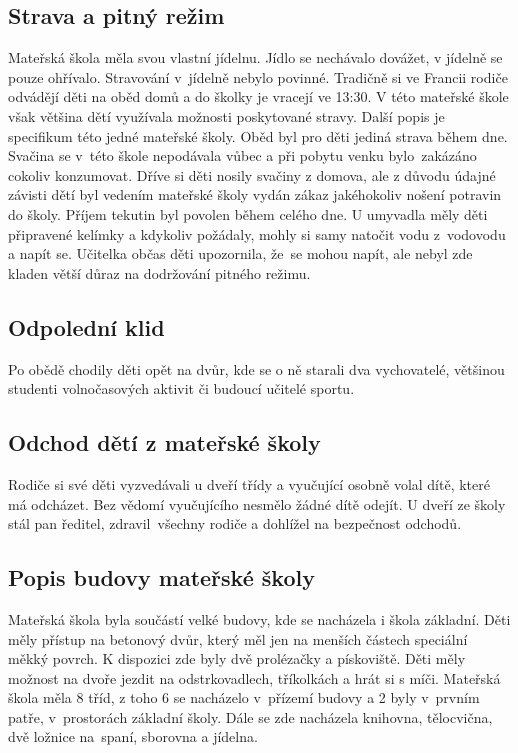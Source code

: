 		\subsection{Strava a pitný režim}
			Mateřská škola měla svou vlastní jídelnu. Jídlo se nechávalo dovážet, v jídelně se pouze ohřívalo. Stravování v jídelně nebylo povinné. Tradičně si ve Francii rodiče odvádějí děti na oběd domů a do školky je vracejí ve 13:30. V této mateřské škole však většina dětí využívala možnosti poskytované stravy. 
			Další popis je specifikum této jedné mateřské školy. Oběd byl pro děti jediná strava během dne. Svačina se v této škole nepodávala vůbec a při pobytu venku bylo zakázáno cokoliv konzumovat. Dříve si děti nosily svačiny z domova, ale z důvodu údajné závisti dětí byl vedením mateřské školy vydán zákaz jakéhokoliv nošení potravin do školy. 
			Příjem tekutin byl povolen během celého dne. U umyvadla měly děti připravené kelímky a kdykoliv požádaly, mohly si samy natočit vodu z vodovodu a napít se. Učitelka občas děti upozornila, že se mohou napít, ale nebyl zde kladen větší důraz na dodržování pitného režimu.

		\subsection{Odpolední klid}
		\label{spani}
			Po obědě chodily děti opět na dvůr, kde se o ně starali dva vychovatelé, většinou studenti volnočasových aktivit či budoucí učitelé sportu.

		\subsection{Odchod dětí z mateřské školy}
			Rodiče si své děti vyzvedávali u dveří třídy a vyučující osobně volal dítě, které má odcházet. Bez vědomí vyučujícího nesmělo žádné dítě odejít. U dveří ze školy stál pan ředitel, zdravil všechny rodiče a dohlížel na bezpečnost odchodů. 

		\subsection{Popis budovy mateřské školy}

			Mateřská škola byla součástí velké budovy, kde se nacházela i škola základní. Děti měly přístup na betonový dvůr, který měl jen na menších částech speciální měkký povrch. K dispozici zde byly dvě prolézačky a pískoviště. Děti měly možnost na dvoře jezdit na odstrkovadlech, tříkolkách a hrát si s míči. 
			Mateřská škola měla 8 tříd, z toho 6 se nacházelo v přízemí budovy a 2 byly v prvním patře, v prostorách základní školy. Dále se zde nacházela knihovna, tělocvična, dvě ložnice na spaní, sborovna a jídelna. 

